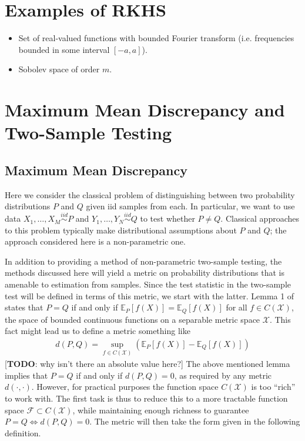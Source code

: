 \documentclass[12pt]{article}
\newcommand{\E}{\mathbb{E}}
\begin{document}
 \section{Examples of RKHS}
 \begin{itemize}
 \item Set of real-valued functions with bounded Fourier transform (i.e. frequencies bounded in some interval $[-a, a]$). 
 \item Sobolev space of order $m$. 
 \end{itemize}


\section{Maximum Mean Discrepancy and Two-Sample Testing}
\subsection{Maximum Mean Discrepancy}
Here we consider the classical problem of distinguishing between two probability distributions $P$ and $Q$ given iid samples from each. In particular, we want to use data 
$X_1, \dots, X_M \overset{iid}{\sim} P$ and $Y_1, \dots, Y_N \overset{iid}{\sim} Q$ to test whether $P \neq Q$. Classical approaches to this problem typically make distributional 
assumptions about $P$ and $Q$; the approach considered here is a non-parametric one. 

In addition to providing a method of non-parametric two-sample testing, the methods discussed here will yield a metric on probability distributions that is amenable to estimation 
from samples. Since the test statistic in the two-sample test will be defined in terms of this metric, we start with the latter. Lemma 1 of \cite{Gretton1} states that 
$P = Q$ if and only if $\E_P[f(X)] = \E_Q[f(X)]$ for all $f \in C(\mathcal{X})$, the space of bounded continuous functions on a separable metric space 
$\mathcal{X}$. This fact might lead us to define a metric something like 
\begin{align*}
d(P, Q) = \sup_{f \in C(\mathcal{X})} \left(\E_P[f(X)] - \E_Q[f(X)]\right)
\end{align*}
[\textbf{TODO}: why isn't there an absolute value here?]
The above mentioned lemma implies that $P = Q$ if and only if $d(P, Q) = 0$, as required by any metric $d(\cdot, \cdot)$. However, for practical purposes the function space 
$C(\mathcal{X})$ is too ``rich'' to work with. The first task is thus to reduce this to a more tractable function space $\mathcal{F} \subset C(\mathcal{X})$, 
while maintaining enough richness to guarantee $P = Q \iff d(P, Q) = 0$. The metric will then take the form given in the following definition. 
\end{document}
